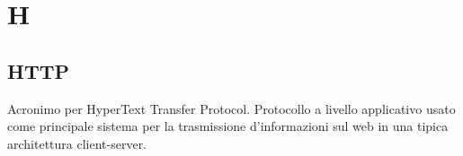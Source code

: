\section*{H}
\markright{}
\subsection*{HTTP}
Acronimo per HyperText Transfer Protocol. Protocollo a livello applicativo usato come principale sistema per la trasmissione d'informazioni sul web in una tipica architettura client-server.